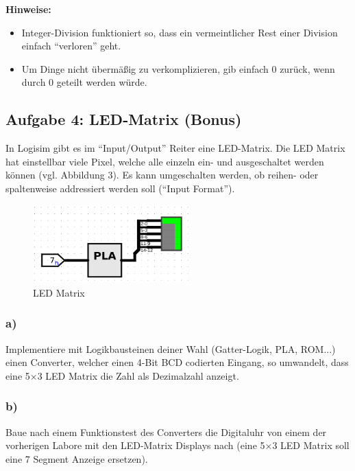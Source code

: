 \documentclass[a4paper]{scrartcl}
\begin{document}
\textbf{Hinweise:}
\begin{itemize}
  \item Integer-Division funktioniert so, dass ein vermeintlicher Rest einer Division einfach ``verloren'' geht.
  \item Um Dinge nicht übermäßig zu verkomplizieren, gib einfach 0 zurück, wenn durch 0 geteilt werden würde.
\end{itemize}

\subsection*{Aufgabe 4: LED-Matrix (Bonus)}
In Logisim gibt es im ``Input/Output'' Reiter eine LED-Matrix. Die LED Matrix hat einstellbar viele Pixel, welche alle einzeln ein- und ausgeschaltet werden können (vgl. Abbildung 3).
Es kann umgeschalten werden, ob reihen- oder spaltenweise addressiert werden soll (``Input Format'').
\begin{figure}[h]
  \centering
  \includegraphics[width=6cm]{LEDMatrix.png}
\caption{LED Matrix}
\end{figure}

\subsubsection*{a)}
Implementiere mit Logikbausteinen deiner Wahl (Gatter-Logik, PLA, ROM...) einen
Converter, welcher einen 4-Bit BCD codierten Eingang, so umwandelt, dass eine 5×3
LED Matrix die Zahl als Dezimalzahl anzeigt.
\subsubsection*{b)}
Baue nach einem Funktionstest des Converters die Digitaluhr von einem der vorherigen 
Labore mit
den LED-Matrix Displays nach (eine 5×3 LED Matrix soll eine 7 Segment Anzeige
ersetzen).

\newpage
\end{document}
